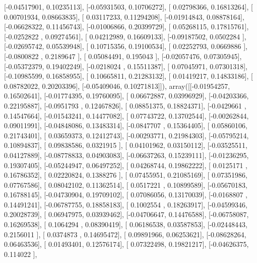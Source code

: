 \documentclass{article}
\begin{document}
       [-0.04517901,  0.10235113],
       [-0.05931503,  0.10706272],
       [ 0.02798366,  0.16813264],
       [ 0.00701934,  0.08663835],
       [ 0.03117233,  0.11294208],
       [-0.01914843,  0.08878164],
       [-0.06628322,  0.11456743],
       [-0.01006866,  0.20399729],
       [ 0.05268115,  0.17815761],
       [-0.0252822 ,  0.09274561],
       [ 0.04212989,  0.16609133],
       [-0.09187502,  0.0502284 ],
       [-0.02695742,  0.05539948],
       [ 0.10715356,  0.19100534],
       [ 0.02252793,  0.0669886 ],
       [-0.0800822 ,  0.2189647 ],
       [ 0.05084491,  0.195043  ],
       [-0.02057476,  0.07305945],
       [-0.05372379,  0.19402249],
       [-0.0218024 ,  0.15511387],
       [ 0.07045971,  0.07301318],
       [-0.10985599,  0.16858955],
       [ 0.10665811,  0.21283132],
       [ 0.01419217,  0.14833186],
       [ 0.08782022,  0.20203396],
       [-0.05409046,  0.10271813]]), array([[-0.01954257,  0.16502641],
       [-0.01774395,  0.19760095],
       [ 0.06672887,  0.03996929],
       [-0.04203366,  0.22195887],
       [-0.0951793 ,  0.12467826],
       [ 0.08851375,  0.18824371],
       [-0.0429661 ,  0.14547664],
       [-0.01543241,  0.14477082],
       [ 0.07743722,  0.13702544],
       [-0.00262844,  0.09011991],
       [-0.04848086,  0.13483314],
       [-0.0847707 ,  0.15364405],
       [ 0.05860106,  0.21743401],
       [ 0.03659373,  0.12412743],
       [-0.00293771,  0.21984303],
       [-0.05795214,  0.10894837],
       [ 0.09838586,  0.0321915 ],
       [ 0.04101962,  0.03150112],
       [-0.03525511,  0.04127889],
       [-0.08778833,  0.04903083],
       [-0.06637263,  0.15239111],
       [-0.01236295,  0.19307405],
       [-0.05244947,  0.06497252],
       [ 0.04268744,  0.19862222],
       [ 0.0125171 ,  0.16786352],
       [ 0.02220824,  0.1388276 ],
       [ 0.07455951,  0.21085169],
       [ 0.07351986,  0.07767586],
       [ 0.08042102,  0.11362514],
       [ 0.0517221 ,  0.10899589],
       [-0.05670183,  0.16788145],
       [-0.04730904,  0.19709102],
       [ 0.07086056,  0.13170039],
       [-0.0168807 ,  0.14491241],
       [-0.06787755,  0.18858183],
       [ 0.1002554 ,  0.18263917],
       [-0.04599346,  0.20028739],
       [ 0.06947975,  0.03939462],
       [-0.04706647,  0.14476588],
       [-0.06758087,  0.16269538],
       [ 0.1064294 ,  0.08390419],
       [ 0.06186538,  0.03587853],
       [-0.02448443,  0.2156011 ],
       [ 0.0374873 ,  0.14695472],
       [ 0.09891966,  0.06253621],
       [-0.08628264,  0.06463536],
       [ 0.01493401,  0.12576174],
       [ 0.07322498,  0.19821217],
       [-0.04626375,  0.114022  ],
\end{document}

